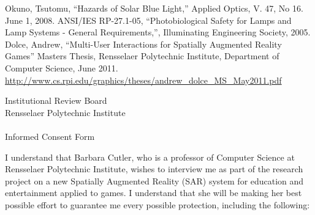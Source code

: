 \documentclass[10pt]{article}
\begin{document}
\begin{thebibliography}{widest entry}
   Okuno, Tsutomu, ``Hazards of Solar Blue Light,'' Applied Optics, V. 47,
    No 16. June 1, 2008.
   ANSI/IES RP-27.1-05, ``Photobiological Safety for Lamps and Lamp Systems -
 General Requirements,'', Illuminating Engineering Society, 2005.
Dolce, Andrew, 
``Multi-User Interactions for Spatially Augmented Reality Games''
Masters Thesis, Rensselaer Polytechnic Institute, 
Department of Computer Science,
June 2011.
\url{http://www.cs.rpi.edu/graphics/theses/andrew_dolce_MS_May2011.pdf}
\end{thebibliography}



\newpage

\pagestyle{empty}

\vspace*{-0.6in}
\begin{center}
{\Large 
Institutional Review Board \\
Rensselaer Polytechnic Institute} \\
\ \\
\vspace{-0.05in}
{\large Informed Consent Form}
\end{center}
\vspace{-0.05in}

\noindent
I understand that Barbara Cutler, who is a professor of Computer
Science at Rensselaer Polytechnic Institute, wishes to interview me as
part of the research project on a new Spatially Augmented Reality (SAR)
system for education and entertainment applied to games.  I understand
that she will be making her best possible effort to guarantee me every
possible protection, including the following:
\end{document}

